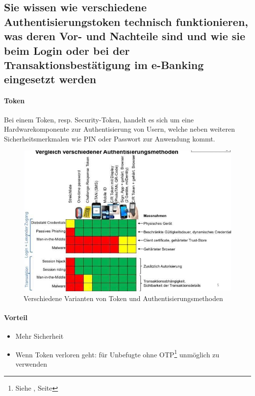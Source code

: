 \documentclass[10pt,a4paper]{article}
\begin{document}
\subsection*{Sie wissen wie verschiedene Authentisierungstoken technisch funktionieren, was deren Vor- und Nachteile sind und wie sie beim Login oder bei der Transaktionsbestätigung im e-Banking eingesetzt werden}
\paragraph*{Token}Bei einem Token, resp. Security-Token, handelt es sich um eine Hardwarekomponente zur Authentisierung von Usern, welche neben weiteren Sicherheitsmerkmalen wie PIN oder Passwort zur Anwendung kommt.

\begin{figure}[H]
    \begin{center}
    \includegraphics[width=16cm]{images/token.png}
    \caption{Verschiedene Varianten von Token und Authentisierungsmethoden}
    \label{token}
    \end{center}
\end{figure}
\paragraph*{Vorteil}
\begin{itemize}[noitemsep,topsep=0pt,leftmargin=*]
    \item Mehr Sicherheit
    \item Wenn Token verloren geht: für Unbefugte ohne OTP\footnote{Siehe \underline{}, Seite \pageref{para:One-Time Pad}} unmöglich zu verwenden
\end{itemize}
\end{document}
